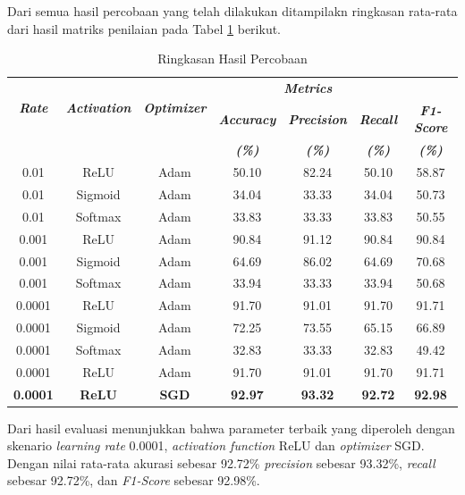     


    Dari semua hasil percobaan yang telah dilakukan ditampilakn ringkasan rata-rata dari hasil matriks penilaian pada Tabel \ref{Ringkasan Hasil Percobaan} berikut.


\begin{table}[H]
    \centering
    \caption{Ringkasan Hasil Percobaan}
    \begin{tabular}{ccccccc}
        \toprule
        \multirow{2}{*}{\textbf{\textit{Rate}}} & \multirow{2}{*}{\textbf{\textit{Activation}}} & \multirow{2}{*}{\textbf{\textit{Optimizer}}} & \multicolumn{3}{c}{\textbf{\textit{Metrics}}} \\
        \cmidrule{4-7}
        & & & \textbf{\textit{Accuracy}} & \textbf{\textit{Precision}} & \textbf{\textit{Recall}} & \textbf{\textit{F1-Score}} \\
        & & & \textbf{\textit{(\%)}} & \textbf{\textit{(\%)}} & \textbf{\textit{(\%)}} & \textbf{\textit{(\%)}} \\
        \midrule
        0.01 & ReLU   & Adam  & 50.10 & 82.24 & 50.10 & 58.87\\
        0.01 & Sigmoid & Adam  & 34.04 & 33.33 & 34.04 & 50.73 \\
        0.01 & Softmax & Adam  & 33.83 & 33.33 & 33.83 & 50.55\\
        \midrule
        0.001 & ReLU    & Adam  & 90.84 & 91.12 & 90.84 & 90.84\\
        0.001 & Sigmoid & Adam  & 64.69 & 86.02 & 64.69 & 70.68 \\
        0.001 & Softmax & Adam  & 33.94 & 33.33 & 33.94 & 50.68\\
        \midrule
        0.0001 & ReLU & Adam  & 91.70 & 91.01 & 91.70 & 91.71\\
        0.0001 & Sigmoid & Adam  & 72.25 & 73.55 & 65.15 & 66.89\\
        0.0001 & Softmax & Adam & 32.83 & 33.33 & 32.83 & 49.42\\
        \midrule
        0.0001 & ReLU & Adam  & 91.70 & 91.01 & 91.70 & 91.71\\
        \textbf{0.0001} & \textbf{ReLU} & \textbf{SGD} & \textbf{92.97} & \textbf{93.32} & \textbf{92.72} & \textbf{92.98}\\
        \bottomrule
    \end{tabular}
    \label{Ringkasan Hasil Percobaan}
\end{table}


    Dari hasil evaluasi menunjukkan bahwa parameter terbaik yang diperoleh dengan skenario \textit{learning rate} 
    0.0001, \textit{activation function} ReLU dan \textit{optimizer} SGD. Dengan nilai rata-rata akurasi sebesar
     92.72\% \textit{precision} sebesar 93.32\%, \textit{recall} sebesar 92.72\%, dan \textit{F1-Score} sebesar 92.98\%.


